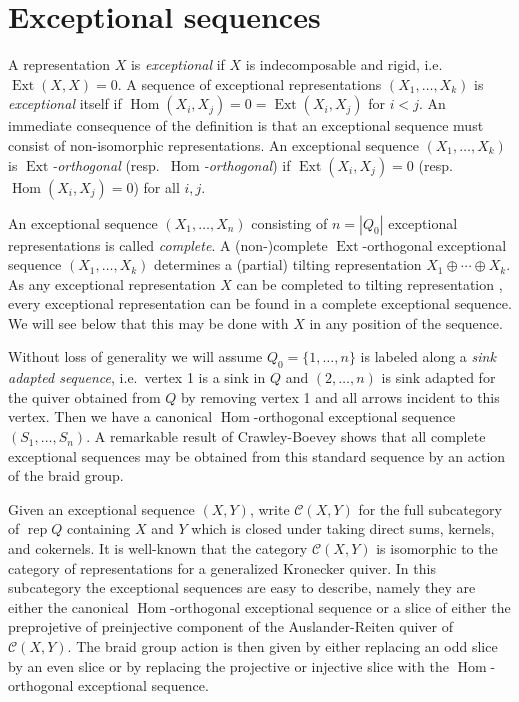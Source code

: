 \documentclass{amsart}
\numberwithin{equation}{section}
\newcommand{\cC}{\mathcal{C}}
\newcommand{\Ext}{\operatorname{Ext}}
\newcommand{\Hom}{\operatorname{Hom}}
\newcommand{\rep}{\operatorname{rep}}
\begin{document}

\section{Exceptional sequences}

A representation $X$ is \emph{exceptional} if $X$ is indecomposable and rigid, i.e.\ $\Ext(X,X)=0$.
A sequence of exceptional representations $(X_1,\ldots,X_k)$ is \emph{exceptional} itself if $\Hom(X_i,X_j)=0=\Ext(X_i,X_j)$ for $i<j$.
An immediate consequence of the definition is that an exceptional sequence must consist of non-isomorphic representations. 
An exceptional sequence $(X_1,\ldots,X_k)$ is \emph{$\Ext$-orthogonal} (resp.\ \emph{$\Hom$-orthogonal}) if $\Ext(X_i,X_j)=0$ (resp. $\Hom(X_i,X_j)=0$) for all $i,j$.

An exceptional sequence $(X_1,\ldots,X_n)$ consisting of $n=|Q_0|$ exceptional representations is called \emph{complete}.
A (non-)complete $\Ext$-orthogonal exceptional sequence $(X_1,\ldots,X_k)$ determines a (partial) tilting representation $X_1\oplus\cdots\oplus X_k$. 
As any exceptional representation $X$ can be completed to tilting representation \cite{???}, every exceptional representation can be found in a complete exceptional sequence.
We will see below that this may be done with $X$ in any position of the sequence. 

Without loss of generality we will assume $Q_0=\{1,\ldots,n\}$ is labeled along a \emph{sink adapted sequence}, i.e.\ vertex 1 is a sink in $Q$ and $(2,\ldots,n)$ is sink adapted for the quiver obtained from $Q$ by removing vertex 1 and all arrows incident to this vertex.
Then we have a canonical $\Hom$-orthogonal exceptional sequence $(S_1,\ldots,S_n)$.
A remarkable result of Crawley-Boevey shows that all complete exceptional sequences may be obtained from this standard sequence by an action of the braid group.

Given an exceptional sequence $(X,Y)$, write $\cC(X,Y)$ for the full subcategory of $\rep Q$ containing $X$ and $Y$ which is closed under taking direct sums, kernels, and cokernels.
It is well-known \cite{???} that the category $\cC(X,Y)$ is isomorphic to the category of representations for a generalized Kronecker quiver.
In this subcategory the exceptional sequences are easy to describe, namely they are either the canonical $\Hom$-orthogonal exceptional sequence or a slice of either the preprojetive of preinjective component of the Auslander-Reiten quiver of $\cC(X,Y)$.
The braid group action is then given by either replacing an odd slice by an even slice or by replacing the projective or injective slice with the $\Hom$-orthogonal exceptional sequence.
\end{document}
